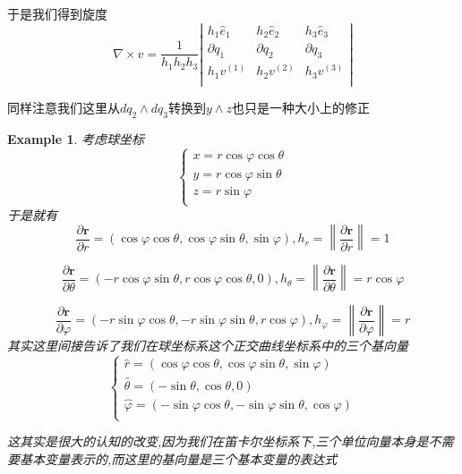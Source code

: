 \documentclass[11pt,hyperref,a4paper,UTF8]{ctexart}
\newtheorem{example}{Example}[subsection]
\newcommand{\ve}{\boldsymbol}
\begin{document}
\begin{CJK}{UTF8}{gkai}
于是我们得到旋度
\[\nabla \times v = \frac{1}{h_1 h_2 h_3} \left|\begin{matrix}
  h_1 \hat{e}_1 & h_2 \hat{e}_2 & h_3 \hat{e}_3\\
  \partial q_1 & \partial q_2 & \partial q_3\\
  h_1 v^{(1)} & h_2 v^{(2)} & h_3 v^{(3)}\\
\end{matrix}\right|\]

同样注意我们这里从$dq_2\wedge dq_3$转换到$y \wedge z$也只是一种大小上的修正

\begin{example}
  考虑球坐标
  \[\begin{cases}
    x = r\cos \varphi \cos \theta\\
    y = r\cos \varphi \sin \theta\\
    z = r\sin \varphi\\
  \end{cases}\]
  于是就有
  \[\frac{\partial \ve{r}}{\partial r} = (\cos \varphi \cos \theta, \cos \varphi \sin \theta, \sin \varphi), h_r = \left\|\frac{\partial \ve{r}}{\partial r}\right\| = 1\]

  \[\frac{\partial \ve{r}}{\partial \theta} = (- r\cos \varphi \sin \theta, r \cos \varphi \cos \theta, 0), h_\theta = \left\|\frac{\partial \ve{r}}{\partial \theta}\right\| = r\cos \varphi\]

  \[\frac{\partial \ve{r}}{\partial \varphi} = (- r \sin \varphi \cos \theta, - r \sin \varphi \sin \theta, r \cos \varphi), h_\varphi = \left\|\frac{\partial \ve{r}}{\partial \varphi}\right\| = r\]
  其实这里间接告诉了我们在球坐标系这个正交曲线坐标系中的三个基向量
  \[\begin{cases}
    \hat{r} = (\cos \varphi \cos \theta, \cos \varphi \sin \theta, \sin \varphi)\\
    \hat{\theta} = (-  \sin \theta, \cos \theta, 0)\\
    \hat{\varphi} = (- \sin \varphi \cos \theta, - \sin \varphi \sin \theta,\cos \varphi)\\
  \end{cases}\]

  这其实是很大的认知的改变,因为我们在笛卡尔坐标系下,三个单位向量本身是不需要基本变量表示的,而这里的基向量是三个基本变量的表达式\\


\end{example}
\end{CJK}
\end{document}
